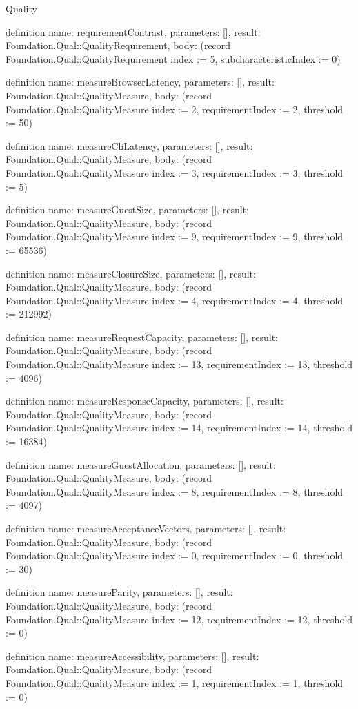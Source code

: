 \begin{lexlean}{Quality}
\begin{semanticmodule}
definition{
  name: requirementContrast,
  parameters: [],
  result: Foundation.Qual::QualityRequirement,
  body: (record Foundation.Qual::QualityRequirement {index := 5, subcharacteristicIndex := 0})
}

definition{
  name: measureBrowserLatency,
  parameters: [],
  result: Foundation.Qual::QualityMeasure,
  body: (record Foundation.Qual::QualityMeasure {index := 2, requirementIndex := 2, threshold := 50})
}

definition{
  name: measureCliLatency,
  parameters: [],
  result: Foundation.Qual::QualityMeasure,
  body: (record Foundation.Qual::QualityMeasure {index := 3, requirementIndex := 3, threshold := 5})
}

definition{
  name: measureGuestSize,
  parameters: [],
  result: Foundation.Qual::QualityMeasure,
  body: (record Foundation.Qual::QualityMeasure {index := 9, requirementIndex := 9, threshold := 65536})
}

definition{
  name: measureClosureSize,
  parameters: [],
  result: Foundation.Qual::QualityMeasure,
  body: (record Foundation.Qual::QualityMeasure {index := 4, requirementIndex := 4, threshold := 212992})
}

definition{
  name: measureRequestCapacity,
  parameters: [],
  result: Foundation.Qual::QualityMeasure,
  body: (record Foundation.Qual::QualityMeasure {index := 13, requirementIndex := 13, threshold := 4096})
}

definition{
  name: measureResponseCapacity,
  parameters: [],
  result: Foundation.Qual::QualityMeasure,
  body: (record Foundation.Qual::QualityMeasure {index := 14, requirementIndex := 14, threshold := 16384})
}

definition{
  name: measureGuestAllocation,
  parameters: [],
  result: Foundation.Qual::QualityMeasure,
  body: (record Foundation.Qual::QualityMeasure {index := 8, requirementIndex := 8, threshold := 4097})
}

definition{
  name: measureAcceptanceVectors,
  parameters: [],
  result: Foundation.Qual::QualityMeasure,
  body: (record Foundation.Qual::QualityMeasure {index := 0, requirementIndex := 0, threshold := 30})
}

definition{
  name: measureParity,
  parameters: [],
  result: Foundation.Qual::QualityMeasure,
  body: (record Foundation.Qual::QualityMeasure {index := 12, requirementIndex := 12, threshold := 0})
}

definition{
  name: measureAccessibility,
  parameters: [],
  result: Foundation.Qual::QualityMeasure,
  body: (record Foundation.Qual::QualityMeasure {index := 1, requirementIndex := 1, threshold := 0})
}


\end{semanticmodule}
\end{lexlean}
